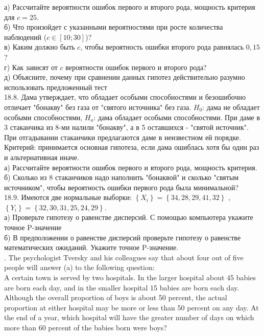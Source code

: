 \documentclass[pdftex,12pt,a4paper]{article}
\begin{document}
 а) Рассчитайте вероятности ошибок
первого и второго рода, мощность критерия для $c=25$. \\
б) Что произойдет с указанными вероятностями при росте количества
наблюдений ($c\in[10;30]$)? \\
в) Каким должно быть $c$, чтобы вероятность ошибки второго рода
равнялась $0,15$? \\
г) Как зависят от $c$ вероятности ошибок первого и второго рода?
\\
д) Объясните, почему при сравнении данных гипотез
действительно разумно использовать предложенный тест \\
18.8. Дама утверждает, что обладает особыми способностями и
безошибочно отличает "бонакву" без газа от "святого источника" без
газа. $H_{0}$: дама не обладает особыми способностями, $H_{a}$:
дама обладает особыми способностями. При даме в 3 стаканчика из
8-ми налили "бонакву", а в 5 оставшихся - "святой источник". При
отгадывании стаканчики предлагаются даме в неизвестном ей порядке.
Критерий: принимается основная гипотеза, если дама ошиблась хотя
бы один раз и альтернативная иначе. \\
а) Рассчитайте вероятности ошибок первого и второго рода, мощность
критерия. \\
б) Сколько из 8 стаканчиков надо наполнить "бонаквой"
и сколько "святым источником", чтобы вероятность ошибки первого
рода была
минимальной? \\
18.9. Имеются две нормальные выборки: $\left\{X_{i}
\right\}=\left\{34,28,29,41,32\right\}$ , $\left\{Y_{i}
\right\}=\left\{32,30,31,25,24,29\right\}$. \\
а) Проверьте гипотезу о равенстве дисперсий. С помощью
компьютера укажите точное P-значение\\
б) В предположении о равенстве дисперсий проверьте гипотезу о
равенстве математических ожиданий. Укажите точное P-значение. \\
. The psychologist Tversky and his colleagues say that about
four out of five people will answer (a) to the following question:
\\ A certain town is served by two hospitals. In the larger
hospital about 45 babies are born each day, and in the smaller
hospital 15 babies are born each day. Although the overall
proportion of boys is about 50 percent, the actual proportion at
either hospital may be more or less than 50 percent on any day. At
the end of a year, which hospital will have the greater number of
days on which more than 60 percent of the babies born were boys?
\end{document}
